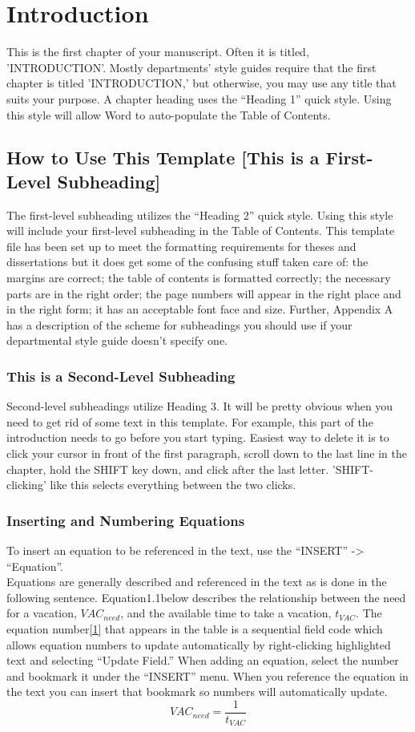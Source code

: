 \documentclass[a4paper,12pt,one side]{report}
\theoremstyle{definition}
\begin{document}
\chapter{Introduction}
\begin{justify}
This is the first chapter of your manuscript. Often it is titled, 'INTRODUCTION'. Mostly departments’ style guides require that the first chapter is titled 'INTRODUCTION,' but otherwise, you may use any title that suits your purpose. A chapter heading uses the “Heading 1” quick style.  Using this style will allow Word to auto-populate the Table of Contents.
\section{How to Use This Template [This is a First-Level Subheading]}
The first-level subheading utilizes the “Heading 2” quick style.  Using this style will include your first-level subheading in the Table of Contents. This template file has been set up to meet the formatting requirements for theses and dissertations but it does get some of the confusing stuff taken care of: the margins are correct; the table of contents is formatted correctly; the necessary parts are in the right order; the page numbers will appear in the right place and in the right form; it has an acceptable font face and size. Further, Appendix A has a description of the scheme for subheadings you should use if your departmental style guide doesn't specify one.
\subsection{This is a Second-Level Subheading}
Second-level subheadings utilize Heading 3.  It will be pretty obvious when you need to get rid of some text in this template. For example, this part of the introduction needs to go before you start typing. Easiest way to delete it is to click your cursor in front of the first paragraph, scroll down to the last line in the chapter, hold the SHIFT key down, and click after the last letter. 'SHIFT-clicking' like this selects everything between the two clicks.
\subsection{Inserting and Numbering Equations}
To insert an equation to be referenced in the text, use the “INSERT” ->  “Equation”.\\
Equations are generally described and referenced in the text as is done in the following sentence.  Equation1.1below describes the relationship between the need for a vacation, $VAC_{need}$, and the available time to take a vacation, $t_{VAC}$.  The equation number\eqref{1} that appears in the table is a sequential field code which allows equation numbers to update automatically by right-clicking highlighted text and selecting “Update Field.”  When adding an equation, select the number and bookmark it under the “INSERT” menu.  When you reference the equation in the text you can insert that bookmark so numbers will automatically update.
\begin{equation}\label{1}
    VAC_{need}=\frac{1}{t_{VAC}}
\end{equation}

\end{justify}
\end{document}
